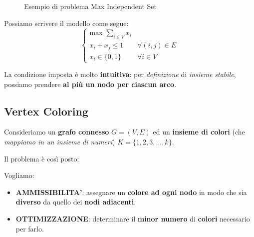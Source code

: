 \begin{figure}[!ht]
    \caption{Esempio di problema Max Independent Set}
\end{figure}

Possiamo scrivere il modello come segue:
\[
    \begin{cases}
        \text{max } \displaystyle\sum_{i\in V} x_i \\
        x_i + x_j \le 1 & \forall (i,j)\in E \\
        x_i \in \{0,1\} & \forall i \in V  
    \end{cases}
\]

\begin{remark}
    La condizione imposta è molto \textbf{intuitiva}: per \textit{definizione}
    di \textit{insieme stabile}, possiamo prendere 
    \textbf{al più un nodo per ciascun arco}.
\end{remark}

\subsection{Vertex Coloring}

Consideriamo un \textbf{grafo connesso} $G=(V,E)$ ed un \textbf{insieme di colori}
(che \textit{mappiamo in un insieme di numeri}) $K=\{1,2,3,\ldots,k\}$.

Il problema è così posto:

\begin{exa}
    Vogliamo:
    \begin{itemize}
        \item \textbf{AMMISSIBILITA'}: assegnare un \textbf{colore ad ogni nodo}
            in modo che sia \textbf{diverso} da quello dei \textbf{nodi adiacenti}.
        \item \textbf{OTTIMIZZAZIONE}: determinare il \textbf{minor numero}
            di \textbf{colori} necessario per farlo.
    \end{itemize}
\end{exa}

